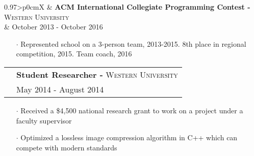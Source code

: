 \documentclass[letterpaper, oneside, final]{scrartcl} %
\newcommand{\gray}{\rowcolor[gray]{.90}} %
\begin{document}
\begin{center}
\vspace{-0.1cm}

\begin{tabularx}{0.97\linewidth}{>{\raggedleft\scshape}p{0cm}X}
\gray & \textbf{ACM International Collegiate Programming Contest -} \textsc{Western University}\\
\gray & {October 2013 - October 2016}\	\
\end{tabularx}
\vspace{-0.1cm}
\begin{itemize} \itemsep-0.2cm
\item[$\cdot$] Represented school on a 3-person team, 2013-2015. 8th place in regional competition, 2015. Team coach, 2016
\end{itemize}

\vspace{-0.1cm}

\pagebreak

\begin{tabularx}{0.97\linewidth}{>{\raggedleft\scshape}p{0cm}X}
\gray & \textbf{Student Researcher -} \textsc{Western University}\\
\gray & {May 2014 - August 2014}\\
\end{tabularx}
\vspace{-0.1cm}
\begin{itemize}\itemsep-0.2cm
\item[$\cdot$] Received a \$4,500 national research grant to work on a project under a faculty supervisor
\item[$\cdot$] Optimized a lossless image compression algorithm in C++ which can compete with modern standards\\
\end{itemize}

\vspace{-0.1cm}




\end{center}
\end{document}
